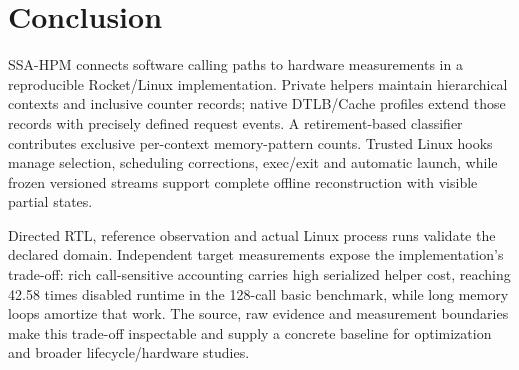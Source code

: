 \section{Conclusion}
SSA-HPM connects software calling paths to hardware measurements in a reproducible Rocket/Linux implementation. Private helpers maintain hierarchical contexts and inclusive counter records; native DTLB/Cache profiles extend those records with precisely defined request events. A retirement-based classifier contributes exclusive per-context memory-pattern counts. Trusted Linux hooks manage selection, scheduling corrections, exec/exit and automatic launch, while frozen versioned streams support complete offline reconstruction with visible partial states.

Directed RTL, reference observation and actual Linux process runs validate the declared domain. Independent target measurements expose the implementation's trade-off: rich call-sensitive accounting carries high serialized helper cost, reaching 42.58 times disabled runtime in the 128-call basic benchmark, while long memory loops amortize that work. The source, raw evidence and measurement boundaries make this trade-off inspectable and supply a concrete baseline for optimization and broader lifecycle/hardware studies.
